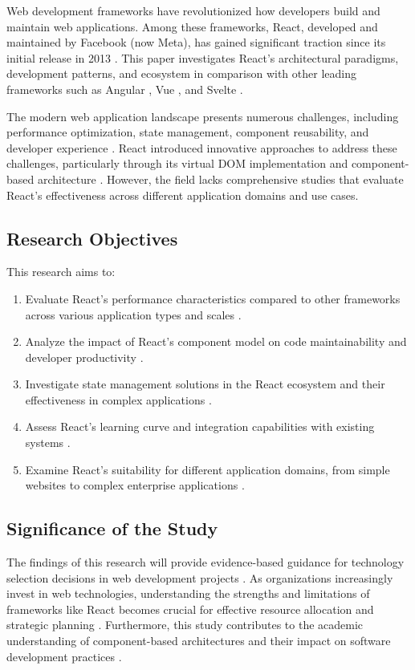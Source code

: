 Web development frameworks have revolutionized how developers build and maintain web applications. Among these frameworks, React, developed and maintained by Facebook (now Meta), has gained significant traction since its initial release in 2013 \cite{react2013}. This paper investigates React's architectural paradigms, development patterns, and ecosystem in comparison with other leading frameworks such as Angular \cite{angular2016}, Vue \cite{vue2014}, and Svelte \cite{svelte2016}.

The modern web application landscape presents numerous challenges, including performance optimization, state management, component reusability, and developer experience \cite{patel2018}. React introduced innovative approaches to address these challenges, particularly through its virtual DOM implementation and component-based architecture \cite{facebook2018}. However, the field lacks comprehensive studies that evaluate React's effectiveness across different application domains and use cases.

\subsection{Research Objectives}
This research aims to:

\begin{enumerate}
    \item Evaluate React's performance characteristics compared to other frameworks across various application types and scales \cite{pereira2020}.
    \item Analyze the impact of React's component model on code maintainability and developer productivity \cite{johnson2019}.
    \item Investigate state management solutions in the React ecosystem and their effectiveness in complex applications \cite{redux2015}.
    \item Assess React's learning curve and integration capabilities with existing systems \cite{kumar2021}.
    \item Examine React's suitability for different application domains, from simple websites to complex enterprise applications \cite{williams2022}.
\end{enumerate}

\subsection{Significance of the Study}
The findings of this research will provide evidence-based guidance for technology selection decisions in web development projects \cite{gartner2022}. As organizations increasingly invest in web technologies, understanding the strengths and limitations of frameworks like React becomes crucial for effective resource allocation and strategic planning \cite{mckinsey2021}. Furthermore, this study contributes to the academic understanding of component-based architectures and their impact on software development practices \cite{richards2020}.

